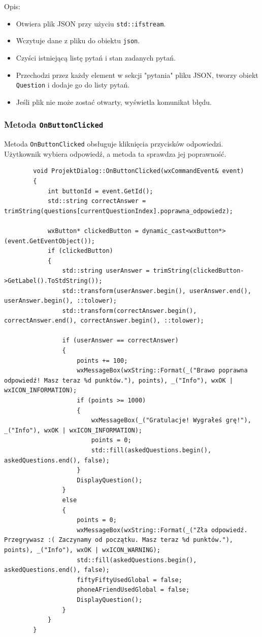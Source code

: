 \documentclass[]{article}
\begin{document}
	Opis:
	\begin{itemize}
		\item Otwiera plik JSON przy użyciu \texttt{std::ifstream}.
		\item Wczytuje dane z pliku do obiektu \texttt{json}.
		\item Czyści istniejącą listę pytań i stan zadanych pytań.
		\item Przechodzi przez każdy element w sekcji "pytania" pliku JSON, tworzy obiekt \texttt{Question} i dodaje go do listy pytań.
		\item Jeśli plik nie może zostać otwarty, wyświetla komunikat błędu.
	\end{itemize}
	\subsubsection{Metoda \texttt{OnButtonClicked}}
	
	Metoda \texttt{OnButtonClicked} obsługuje kliknięcia przycisków odpowiedzi. Użytkownik wybiera odpowiedź, a metoda ta sprawdza jej poprawność.
	
	\begin{verbatim}
		void ProjektDialog::OnButtonClicked(wxCommandEvent& event)
		{
			int buttonId = event.GetId();
			std::string correctAnswer = trimString(questions[currentQuestionIndex].poprawna_odpowiedz);
			
			wxButton* clickedButton = dynamic_cast<wxButton*>(event.GetEventObject());
			if (clickedButton)
			{
				std::string userAnswer = trimString(clickedButton->GetLabel().ToStdString());
				std::transform(userAnswer.begin(), userAnswer.end(), userAnswer.begin(), ::tolower);
				std::transform(correctAnswer.begin(), correctAnswer.end(), correctAnswer.begin(), ::tolower);
				
				if (userAnswer == correctAnswer)
				{
					points += 100;
					wxMessageBox(wxString::Format(_("Brawo poprawna odpowiedź! Masz teraz %d punktów."), points), _("Info"), wxOK | wxICON_INFORMATION);
					if (points >= 1000)
					{
						wxMessageBox(_("Gratulacje! Wygrałeś grę!"), _("Info"), wxOK | wxICON_INFORMATION);
						points = 0;
						std::fill(askedQuestions.begin(), askedQuestions.end(), false);
					}
					DisplayQuestion();
				}
				else
				{
					points = 0;
					wxMessageBox(wxString::Format(_("Zła odpowiedź. Przegrywasz :( Zaczynamy od początku. Masz teraz %d punktów."), points), _("Info"), wxOK | wxICON_WARNING);
					std::fill(askedQuestions.begin(), askedQuestions.end(), false);
					fiftyFiftyUsedGlobal = false;
					phoneAFriendUsedGlobal = false;
					DisplayQuestion();
				}
			}
		}
	\end{verbatim}
	
\end{document}
